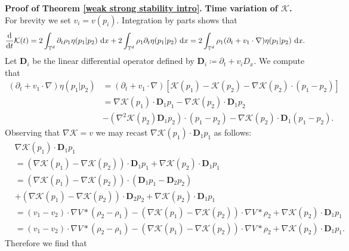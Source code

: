 \documentclass[11pt,reqno]{amsart}
\numberwithin{equation}{section}
\def\dd{{\rm d}}
\begin{document}
\textbf{Proof of Theorem \ref{weak strong stability intro}.}
\textbf{Time variation of $\mathcal{K}$.} 
For brevity we set $v_{i}=v(p_{i})$. Integration by parts shows that 
\begin{align}
\frac{\dd}{\dd t} \mathcal{K}(t)=2\int_{\mathbb{T}^{d}} \partial_{t}\rho_{1}\eta(p_{1}\vert p_{2})\ \dd x+2\int_{\mathbb{T}^{d}} \rho_{1} \partial_{t}\eta(p_{1}\vert p_{2})\ \dd x =2\int_{\mathbb{T}^{d}} \rho_{1}(\partial_{t}+v_{1}\cdot \nabla)\eta(p_{1}\vert p_{2})\ \dd x. 
\label{first time der of K}
\end{align}
Let $\mathbf{D}_{i}$ be the linear differential operator defined by  $\mathbf{D}_{i}\coloneqq\partial_{t}+v_{i}D_{x}$. 
We compute that 
\begin{align*}
(\partial_{t}+v_{1}\cdot \nabla)\eta(p_{1}\vert p_{2})&=(\partial_{t}+v_{1}\cdot \nabla)\left[\mathscr{K}(p_{1})-\mathscr{K}(p_{2})-\nabla{\mathscr{K}}(p_{2})\cdot (p_{1}-p_{2})\right]\\
&=\nabla \mathscr{K}(p_{1})\cdot \mathbf{D}_{1}p_{1}-\nabla\mathscr{K}(p_{2})\cdot \mathbf{D}_{1}p_{2}\\
&-(\nabla^{2}\mathscr{K}(p_{2})\mathbf{D}_{1}p_{2})\cdot (p_{1}-p_{2})-\nabla\mathscr{K}(p_{2})\cdot \mathbf{D}_{1}(p_{1}-p_{2}).
\end{align*}
Observing that $\nabla \mathscr{K}=v$ we may recast $\nabla \mathscr{K}(p_{1})\cdot \mathbf{D}_{1}p_{1}$ as follows:  
\begin{align*}
&\nabla\mathscr{K}(p_{1})\cdot \mathbf{D}_{1}p_{1}\\
&=(\nabla \mathscr{K}(p_{1})-\nabla\mathscr{K}(p_{2}))\cdot \mathbf{D}_{1}p_{1}+\nabla\mathscr{K}(p_{2})\cdot \mathbf{D}_{1}p_{1}\\
&=(\nabla \mathscr{K}(p_{1})-\nabla \mathscr{K}(p_{2}))\cdot(\mathbf{D}_{1}p_{1}-\mathbf{D}_{2}p_{2})\\
&+(\nabla \mathscr{K}(p_{1})-\nabla\mathscr{K}(p_{2}))\cdot \mathbf{D}_{2}p_{2}+\nabla\mathscr{K}(p_{2})\cdot\mathbf{D}_{1}p_{1}\\
&=(v_{1}-v_{2})\cdot \nabla V\ast(\rho_{2}-\rho_{1})-(\nabla \mathscr{K}(p_{1})-\nabla\mathscr{K}(p_{2}))\cdot\nabla V\ast \rho_{2}+\nabla\mathscr{K}(p_{2})\cdot \mathbf{D}_{1}p_{1}\\
&=(v_{1}-v_{2})\cdot \nabla V\ast (\rho_{2}-\rho_{1})-(\nabla \mathscr{K}(p_{1})-\nabla \mathscr{K}(p_{2}))\cdot\nabla V\ast \rho_{2}+\nabla\mathscr{K}(p_{2})\cdot\mathbf{D}_{1}p_{1}.
\end{align*}
Therefore we find that 
\end{document}
